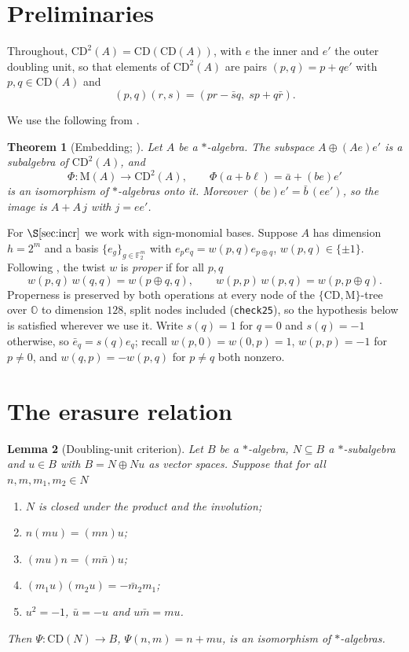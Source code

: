 \documentclass[11pt]{amsart}
\theoremstyle{plain}
\newtheorem{theorem}{Theorem}[section]
\newtheorem{lemma}[theorem]{Lemma}
\theoremstyle{definition}
\newcommand{\CD}{\mathrm{CD}}
\newcommand{\MM}{\mathrm{M}}
\newcommand{\OO}{\mathbb{O}}
\newcommand{\FF}{\mathbb{F}}
\begin{document}
\section{Preliminaries}\label{sec:prelim}

Throughout, $\CD^{2}(A)=\CD(\CD(A))$, with $e$ the inner and $e'$ the outer
doubling unit, so that elements of $\CD^{2}(A)$ are pairs $(p,q)=p+qe'$ with
$p,q\in\CD(A)$ and
\begin{equation}\label{eq:cd2}
  (p,q)(r,s)=(pr-\bar s q,\; sp+q\bar r).
\end{equation}

We use the following from \cite{LuiI}.

\begin{theorem}[Embedding; {\cite[Thm.~3.3]{LuiI}}]\label{thm:embed}
Let $A$ be a $*$-algebra. The subspace $A\oplus(Ae)e'$ is a subalgebra of
$\CD^{2}(A)$, and
\[
  \Phi\colon \MM(A)\longrightarrow \CD^{2}(A),\qquad
  \Phi(a+b\ell)=\bar a+(be)e'
\]
is an isomorphism of $*$-algebras onto it. Moreover $(be)e'=\bar b\,(ee')$, so
the image is $A+A\,j$ with $j=ee'$.
\end{theorem}

For $\S\ref{sec:incr}$ we work with sign-monomial bases. Suppose $A$ has
dimension $h=2^{m}$ and a basis $\{e_g\}_{g\in\FF_2^{m}}$ with
$e_pe_q=w(p,q)e_{p\oplus q}$, $w(p,q)\in\{\pm1\}$. Following \cite{Bales2011tw},
the twist $w$ is \emph{proper} if for all $p,q$
\begin{equation}\label{eq:proper}
  w(p,q)\,w(q,q)=w(p\oplus q,q),
  \qquad
  w(p,p)\,w(p,q)=w(p,p\oplus q).
\end{equation}
Properness is preserved by both operations at every node of the
$\{\CD,\MM\}$-tree over $\OO$ to dimension $128$, split nodes included
(\texttt{check25}), so the hypothesis below is satisfied wherever we use it. Write $s(q)=1$ for $q=0$ and $s(q)=-1$ otherwise, so
$\bar e_q=s(q)e_q$; recall $w(p,0)=w(0,p)=1$, $w(p,p)=-1$ for $p\neq0$, and
$w(q,p)=-w(p,q)$ for $p\neq q$ both nonzero.

\section{The erasure relation}\label{sec:erasure}

\begin{lemma}[Doubling-unit criterion]\label{lem:du}
Let $B$ be a $*$-algebra, $N\subseteq B$ a $*$-subalgebra and $u\in B$ with
$B=N\oplus Nu$ as vector spaces. Suppose that for all $n,m,m_1,m_2\in N$
\begin{enumerate}
\item[(i)] $N$ is closed under the product and the involution;
\item[(ii)] $n(mu)=(mn)u$;
\item[(iii)] $(mu)n=(m\bar n)u$;
\item[(iv)] $(m_1u)(m_2u)=-\bar m_2 m_1$;
\item[(v)] $u^{2}=-1$, $\bar u=-u$ and $u\bar m=mu$.
\end{enumerate}
Then $\Psi\colon\CD(N)\to B$, $\Psi(n,m)=n+mu$, is an isomorphism of
$*$-algebras.
\end{lemma}
\end{document}
